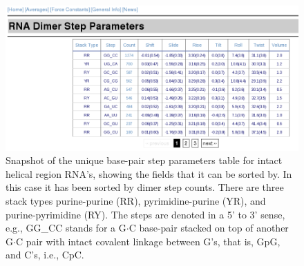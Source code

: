 \begin{figure}[htbp]
\centering
\includegraphics[angle=0, scale=0.5]{Chapter4/average.png}
\caption{Snapshot of the unique base-pair step parameters table for
  intact helical region RNA's, showing the fields that it can be
  sorted by. In this case it has been sorted by dimer step
  counts. There are three stack types purine-purine (RR),
  pyrimidine-purine (YR), and purine-pyrimidine (RY). The steps are
  denoted in a 5' to 3' sense, e.g., GG\_CC stands for a G$\cdot$C
  base-pair stacked on top of another G$\cdot$C pair with intact
  covalent linkage between G's, that is, GpG, and C's, i.e., CpC.}
\label{fig:average}
\end{figure}  

